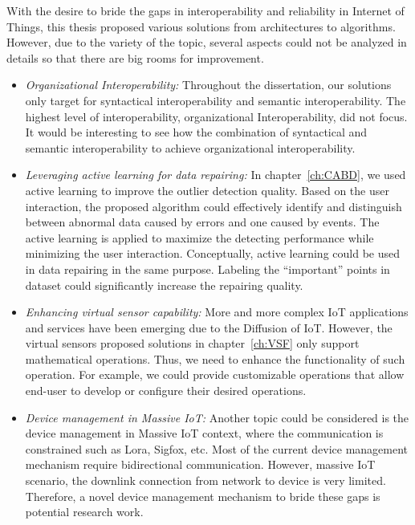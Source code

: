 With the desire to bride the gaps in interoperability and reliability in Internet of Things, this thesis proposed various solutions from architectures to algorithms. However, due to the variety of the topic, several aspects could not be analyzed in details so that there are big rooms for improvement.
\begin{itemize}
    \item \textit{Organizational Interoperability: } Throughout the dissertation, our solutions only target for syntactical interoperability and semantic interoperability. The highest level of interoperability, organizational Interoperability, did not focus. It would be interesting to see how the combination of syntactical and semantic interoperability to achieve organizational interoperability.
    
    \item \textit{Leveraging active learning for data repairing: } In chapter~\ref{ch:CABD}, we used active learning to improve the outlier detection quality. Based on the user interaction, the proposed algorithm could effectively identify and distinguish between abnormal data caused by errors and one caused by events. The active learning is applied to maximize the detecting performance while minimizing the user interaction.  Conceptually, active learning could be used in data repairing in the same purpose. Labeling the ``important'' points in dataset could significantly increase the repairing quality. 
    
    \item \textit{Enhancing virtual sensor capability: } More and more complex IoT applications and services have been emerging due to the Diffusion  of IoT. However, the virtual sensors proposed solutions in chapter~\ref{ch:VSF} only support mathematical operations. Thus, we need to enhance the functionality of such operation. For example, we could provide customizable operations that allow end-user to develop or configure their desired operations. 
    
    \item \textit{Device management in Massive IoT: } Another topic could be considered is the device management in Massive IoT context, where the communication is constrained such as Lora, Sigfox, etc. Most of the current device management mechanism require bidirectional communication. However, massive IoT scenario, the downlink connection from network to device is very limited. Therefore, a novel device management mechanism to bride these gaps is potential research work.
    
    
\end{itemize}
